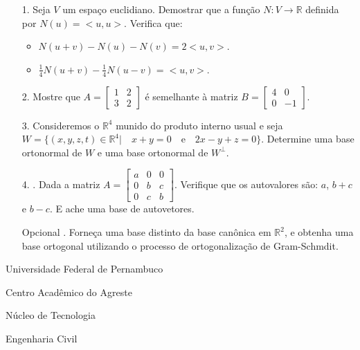 \documentclass[oneside,a4paper,12pt]{article}
\newcommand{\universidade}{Universidade Federal de Pernambuco}
\newcommand{\centro}{Centro Acadêmico do Agreste}
\newcommand{\departamento}{Núcleo de Tecnologia}
\newcommand{\curso}{Engenharia Civil}
\begin{document}
\begin{itemize}
\item[1.] Seja $V$ um espaço euclidiano. Demostrar que a função $N:V\rightarrow \mathbb{R}$ definida por $N(u)=<u,u>$. Verifica que:
\begin{itemize}
	\item $N(u+v)-N(u)-N(v)=2<u,v>$.
	\item $\frac{1}{4}N(u+v)-\frac{1}{4}N(u-v)=<u,v>$.
\end{itemize}
\end{itemize}
\begin{itemize}
\item[2.]  Mostre que $A=\begin{bmatrix}
1    & 2 \\
3    & 2
\end{bmatrix}$ é semelhante à matriz $B=\begin{bmatrix}
4    & 0 \\
0    & -1
\end{bmatrix}$.
 \end{itemize}
 \begin{itemize}
\item [3.] Consideremos o $\mathbb{R}^{4}$ munido do produto interno usual e seja $W=\{(x,y,z,t)\in \mathbb{R}^{4}|\quad x+y=0 \quad\text{e}\quad 2x-y+z=0\}$. Determine uma base ortonormal de $W$ e uma base ortonormal de $W^{\bot}$.
\end{itemize}
\begin{itemize}
\item[4.]. Dada a matriz $A=\begin{bmatrix}
a    & 0 & 0 \\
0    & b & c \\
0    & c & b
\end{bmatrix}$. Verifique que os autovalores são: $a$, $b+c$ e $b-c$. E ache uma base de autovetores.

\end{itemize}
\begin{itemize}
	\item[Opcional]. Forneça uma base distinto da base canônica em $\mathbb{R}^{2}$, e obtenha uma base ortogonal utilizando o processo de ortogonalização de Gram-Schmdit.
	
\end{itemize}
	\flushbottom
	\flushright
    
  \vspace{5pt}
  
     \begin{center}
     	\vspace{0pt}
     	
     	\universidade
     	\par
     	\centro
     	\par
     	\departamento
     	\par
     	\curso
     	\par
     	\vspace{0pt}
     	\\
     \end{center}
     
\end{document}
